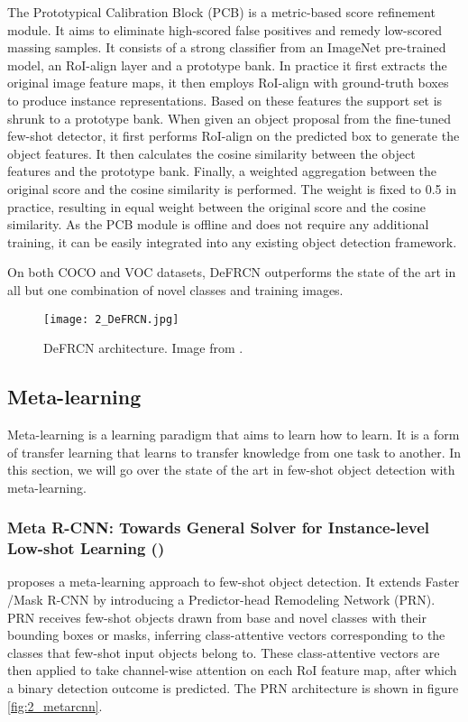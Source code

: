 The Prototypical Calibration Block (PCB) is a metric-based score refinement module. It aims to eliminate high-scored false positives and remedy low-scored massing samples. It consists of a strong classifier from an ImageNet pre-trained model, an RoI-align layer and a prototype bank. In practice it first extracts the original image feature maps, it then employs RoI-align with ground-truth boxes to produce instance representations. Based on these features the support set is shrunk to a prototype bank. When given an object proposal from the fine-tuned few-shot detector, it first performs RoI-align on the predicted box to generate the object features. It then calculates the cosine similarity between the object features and the prototype bank. Finally, a weighted aggregation between the original score and the cosine similarity is performed. The weight is fixed to 0.5 in practice, resulting in equal weight between the original score and the cosine similarity. As the PCB module is offline and does not require any additional training, it can be easily integrated into any existing object detection framework.

On both COCO and VOC datasets, DeFRCN outperforms the state of the art in all but one combination of novel classes and training images.

\begin{figure}[h]
	\centering
	\texttt{[image: 2\_DeFRCN.jpg]}
	\caption{\label{fig:2_DeFRCN} DeFRCN architecture. Image from \citet{DeFRCN}.}
\end{figure}

\subsection{Meta-learning}
Meta-learning is a learning paradigm that aims to learn how to learn. It is a form of transfer learning that learns to transfer knowledge from one task to another. In this section, we will go over the state of the art in few-shot object detection with meta-learning.

\subsubsection{Meta R-CNN: Towards General Solver for Instance-level Low-shot Learning (\citet{meta-rcnn})}
\citet{meta-rcnn} proposes a meta-learning approach to few-shot object detection. It extends
Faster /Mask R-CNN\cite{maskrcnn} by introducing a Predictor-head Remodeling Network (PRN). PRN receives few-shot objects drawn from base and novel classes with their bounding boxes or masks, inferring class-attentive vectors corresponding to the classes that few-shot input objects belong to. These class-attentive vectors are then applied to take channel-wise attention on each RoI feature map, after which a binary detection outcome is predicted. The PRN architecture is shown in figure \ref{fig:2_metarcnn}.


